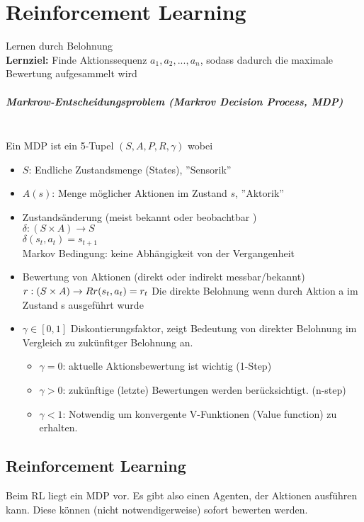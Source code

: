 \chapter{Reinforcement Learning}
Lernen durch Belohnung \\
\textbf{Lernziel:} Finde Aktionssequenz $a_1, a_2, ...,a_n$, sodass dadurch die
maximale Bewertung aufgesammelt wird

\paragraph{Markrow-Entscheidungsproblem (Markrov Decision Process, MDP)} \mbox{}\\

Ein MDP ist ein 5-Tupel $(S, A, P, R, \gamma)$ wobei
\begin{itemize}
    \item $S$: Endliche Zustandsmenge (States), ''Sensorik''
    \item $A(s)$: Menge möglicher Aktionen im Zustand $s$, ''Aktorik''
    \item Zustandsänderung (meist bekannt oder beobachtbar )\\
    $\delta: (S \times A) \rightarrow S$\\ $\delta(s_t,a_t) = s_{t+1}$\\
    Markov Bedingung: keine Abhängigkeit von der Vergangenheit
    \item Bewertung von Aktionen (direkt oder indirekt messbar/bekannt)\\
    $r:(S \times A) \rightarrow R \\ r(s_t,a_t) = r_t \\$
    Die direkte Belohnung wenn durch Aktion a im Zustand s ausgeführt wurde
    \item $\gamma \in [0,1]$ Diskontierungsfaktor, zeigt Bedeutung von direkter
    Belohnung im Vergleich zu zukünfitger Belohnung an.
    \begin{itemize}
        \item $\gamma = 0$: aktuelle Aktionsbewertung ist wichtig (1-Step)
        \item $\gamma > 0$: zukünftige (letzte) Bewertungen werden berücksichtigt. (n-step)
        \item $\gamma < 1$: Notwendig um konvergente V-Funktionen (Value function) zu erhalten.
    \end{itemize}
\end{itemize}

\section{Reinforcement Learning}
Beim RL liegt ein MDP vor. Es gibt also einen Agenten, der Aktionen ausführen kann.
Diese können (nicht notwendigerweise) sofort bewerten werden.

